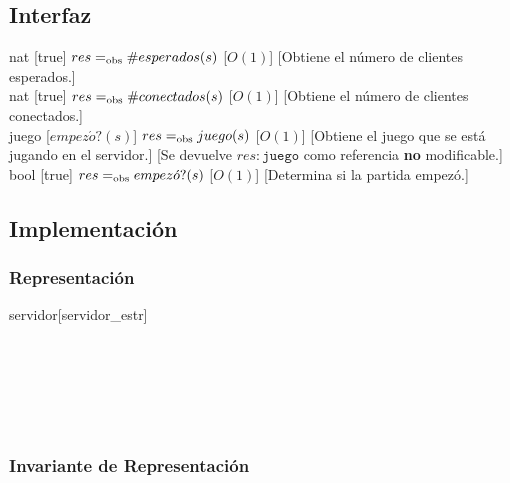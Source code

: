 \begin{interfaz}{\subsection{Interfaz}}
\begin{operaciones}
    \noindent{}
    {}{nat}
    [true]
    {$res=_{\mathrm{obs}} \#esperados(s)$}
    [$O(1)$]
    [Obtiene el número de clientes esperados.]\\

    \noindent{}
    {}{nat}
    [true]
    {$res=_{\mathrm{obs}} \#conectados(s)$}
    [$O(1)$]
    [Obtiene el número de clientes conectados.]\\

    \noindent{}
    {}{juego}
    [$empez\acute{o}?(s)$]
    {$res=_{\mathrm{obs}} juego(s)$}
    [$O(1)$]
    [Obtiene el juego que se está jugando en el servidor.]
    [Se devuelve $res:\texttt{juego}$ como referencia \textbf{no} modificable.]\\

    \noindent{}
    {}{bool}
    [true]
    {$res=_{\mathrm{obs}} empez\acute{o}?(s)$}
    [$O(1)$]
    [Determina si la partida empezó.]
  \end{operaciones}
\end{interfaz}

\subsection{Implementación}

\subsubsection{Representación}

\begin{Estructura}{servidor}[servidor\_estr]
\begin{Tupla}
\begin{adjustwidth}{3em}{}\ \
  \\
  \\
  \\
\end{adjustwidth}\ \ \ \ \ \ \
\end{Tupla}
\end{Estructura}

\subsubsection{Invariante de Representación}

